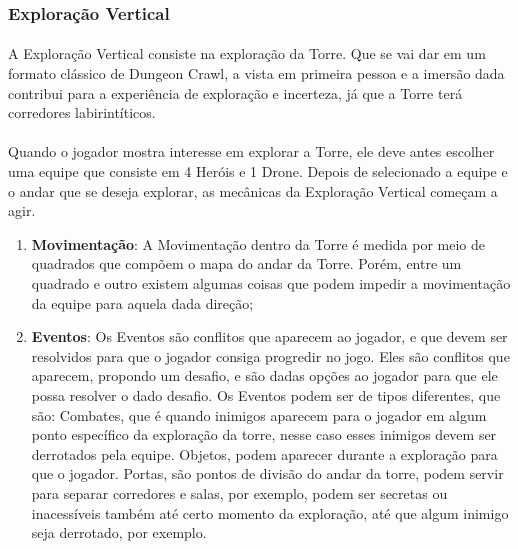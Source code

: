 \documentclass[11pt]{article} %
\begin{document}
\subsubsection{Exploração Vertical}
\paragraph{}A Exploração Vertical consiste na exploração da Torre. Que se vai dar em um formato clássico de Dungeon Crawl, a vista em primeira pessoa e a imersão dada contribui para a experiência de exploração e incerteza, já que a Torre terá corredores labirintíticos.

\paragraph{}Quando o jogador mostra interesse em explorar a Torre, ele deve antes escolher uma equipe que consiste em 4 Heróis e 1 Drone. Depois de selecionado a equipe e o andar que se deseja explorar, as mecânicas da Exploração Vertical começam a agir.

\begin{enumerate}
  \item \textbf{Movimentação}: A Movimentação dentro da Torre é medida por meio de quadrados que compõem o mapa do andar da Torre. Porém, entre um quadrado e outro existem algumas coisas que podem impedir a movimentação da equipe para aquela dada direção;
  \item \textbf{Eventos}: Os Eventos são conflitos que aparecem ao jogador, e que devem ser resolvidos para que o jogador consiga progredir no jogo. Eles são conflitos que aparecem, propondo um desafio, e são dadas opções ao jogador para que ele possa resolver o dado desafio. Os Eventos podem ser de tipos diferentes, que são: Combates, que é quando inimigos aparecem para o jogador em algum ponto específico da exploração da torre, nesse caso esses inimigos devem ser derrotados pela equipe. Objetos, podem aparecer durante a exploração para que o jogador. Portas, são pontos de divisão do andar da torre, podem servir para separar corredores e salas, por exemplo, podem ser secretas ou inacessíveis também até certo momento da exploração, até que algum inimigo seja derrotado, por exemplo.
\end{enumerate}
\newpage
\end{document}
